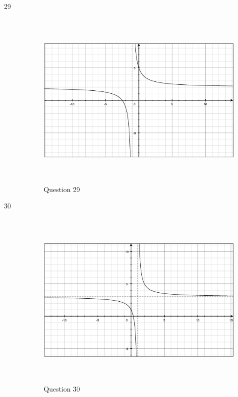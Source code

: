 \documentclass[fleqn,addpoints]{exam}
\begin{document}
\begin{description}
\item[29]
\begin{figure}[H]
  \centering
  \includegraphics[width=12.25cm,height=8.75cm]{question29.eps}
  \caption*{Question 29}
\end{figure}

\item[30]
\begin{figure}[H]
  \centering
  \includegraphics[width=12.25cm,height=8.75cm]{question30.eps}
  \caption*{Question 30}
\end{figure}


\end{description}
\end{document}
